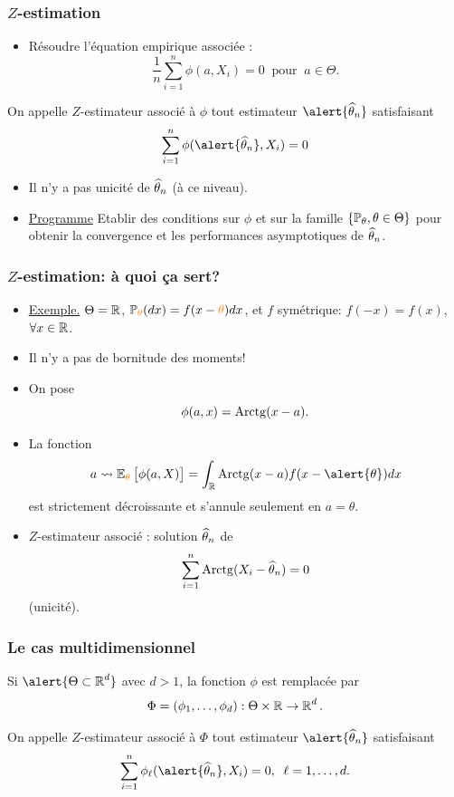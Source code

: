 \begin{frame}
\frametitle{$Z$-estimation}
\begin{itemize}
\item Résoudre l'équation \alert{ empirique} associée :
$$\boxed{\frac{1}{n}\sum_{i = 1}^n \phi(a, X_i)=0\;\;\text{pour}\;\;a\in \Theta.}$$
\end{itemize}
\begin{df}
On appelle \alert{$Z$-estimateur} associé à $\phi$ tout estimateur $\alert{\est}$ satisfaisant
$$\sum_{i = 1}^n \phi(\alert{\est}, X_i)=0$$
\end{df}
\begin{itemize}
\item Il n'y a pas unicité de $\operatorname{\widehat \theta_{\mathnormal{n}}}$ (à ce niveau).
\item \underline{Programme} \alert{ Etablir des conditions}
sur $\phi$ et sur la famille $\{\operatorname{{\mathbb P}}_\theta, \theta \in
\Theta\}$ pour obtenir la convergence et les performances
asymptotiques de $\operatorname{\widehat \theta_{\mathnormal{n}}}$.
  \end{itemize}
\end{frame}

\begin{frame}
\frametitle{$Z$-estimation: \`a quoi \c{c}a sert?}
\begin{itemize}
\item \underline{Exemple.} $\Theta = \operatorname{{\mathbb R}}$,
$\PP_{\tco{\theta}}(dx) = f(x-\tco{\theta})dx$, et
$f$ sym\'etrique: $f(-x)=f(x)$, $\forall x\in \operatorname{{\mathbb R}}$.
\item \alert{ Il n'y a pas de bornitude des moments!}
\item On pose
$$\phi(a,x)={\rm Arctg}(x-a).$$
\item La fonction
$$a \leadsto \E_{\tco{\theta}}\big[\phi(a,X)\big] =
\int_{\R}{\rm Arctg}(x-a)f(x-\alert{\theta})dx$$ est
strictement d\'ecroissante et s'annule seulement en $a=\theta.$
\item \alert{$Z$-estimateur associé :} solution $\operatorname{\widehat \theta_{\mathnormal{n}}}$ de
$$\sum_{i = 1}^n{\rm Arctg}(X_i-\operatorname{\widehat \theta_{\mathnormal{n}}}) = 0$$
\alert{ (unicit\'e)}.
\end{itemize}
\end{frame}


\begin{frame}
\frametitle{Le cas multidimensionnel}
Si $\alert{ \Theta \subset \R^d}$ avec \alert{ $d  >1$}, la fonction $\phi$ est remplacée par
$$\Phi = (\phi_1,\ldots,\phi_d):\Theta \times \operatorname{{\mathbb R}} \rightarrow \operatorname{{\mathbb R}}^d.$$
\begin{definition}
On appelle $Z$-estimateur associé à $\Phi$ tout estimateur $\alert{\est}$ satisfaisant
$$\sum_{i = 1}^n \phi_\ell(\alert{\est}, X_i)=0,\;\;\ell = 1,\ldots, d.$$
\end{definition}
\end{frame}

